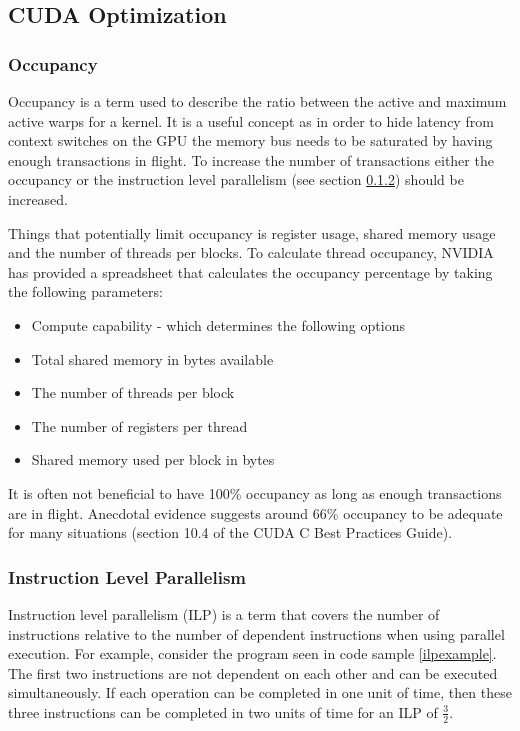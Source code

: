\subsection{CUDA Optimization}\label{subsec:cudaoptimization}
\subsubsection{Occupancy}\label{subsubsec:occupancy}
Occupancy is a term used to describe the ratio between the active and maximum active warps for a kernel.
It is a useful concept as in order to hide latency from context switches on the GPU the memory bus needs to be saturated by having enough transactions in flight.
To increase the number of transactions either the occupancy or the instruction level parallelism (see section \ref{subsubsec:ilp}) should be increased.

Things that potentially limit occupancy is register usage, shared memory usage and the number of threads per blocks.
To calculate thread occupancy, NVIDIA has provided a spreadsheet\cite{occupancycalculator} that calculates the occupancy percentage by taking the following parameters:
\begin{itemize}
\item Compute capability - which determines the following options
\item Total shared memory in bytes available
\item The number of threads per block
\item The number of registers per thread
\item Shared memory used per block in bytes
\end{itemize}

It is often not beneficial to have 100\% occupancy as long as enough transactions are in flight\cite{volkovoccupancy}.
Anecdotal evidence suggests around 66\% occupancy to be adequate for many situations (section 10.4 of the CUDA C Best Practices Guide\cite{cudacoccupancy}).


\subsubsection{Instruction Level Parallelism}\label{subsubsec:ilp}
Instruction level parallelism (ILP) is a term that covers the number of instructions relative to the number of dependent instructions when using parallel execution.
For example, consider the program seen in code sample \ref{ilpexample}.
The first two instructions are not dependent on each other and can be executed simultaneously.
If each operation can be completed in one unit of time, then these three instructions can be completed in two units of time for an ILP of $\frac{3}{2}$.

